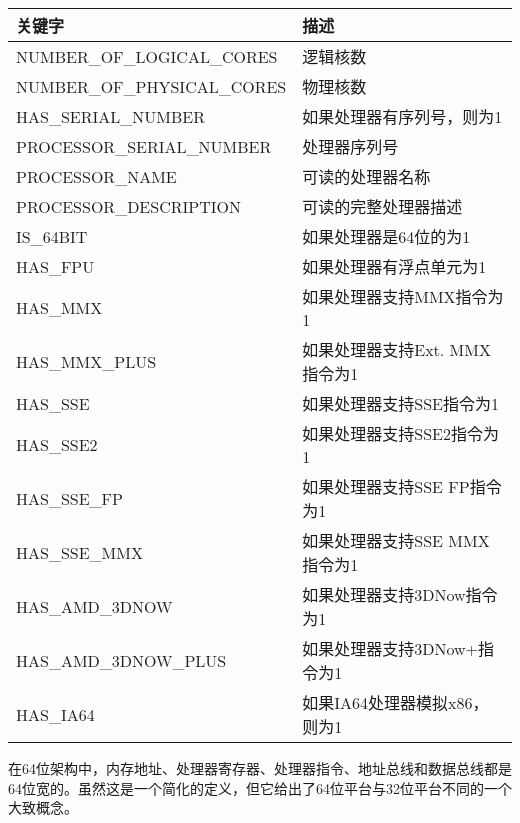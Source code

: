 \begin{longtable}{|l|l|}
\hline
\textbf{关键字}                & \textbf{描述}                                   \\ \hline
\endfirsthead
%
\endhead
%
NUMBER\_OF\_LOGICAL\_CORES  & 逻辑核数                       \\ \hline
NUMBER\_OF\_PHYSICAL\_CORES & 物理核数                      \\ \hline
HAS\_SERIAL\_NUMBER         & 如果处理器有序列号，则为1        \\ \hline
PROCESSOR\_SERIAL\_NUMBER   & 处理器序列号                       \\ \hline
PROCESSOR\_NAME             & 可读的处理器名称                 \\ \hline
PROCESSOR\_DESCRIPTION      & 可读的完整处理器描述     \\ \hline
IS\_64BIT                   & 如果处理器是64位的为1                      \\ \hline
HAS\_FPU                    & 如果处理器有浮点单元为1     \\ \hline
HAS\_MMX                    & 如果处理器支持MMX指令为1      \\ \hline
HAS\_MMX\_PLUS              & 如果处理器支持Ext. MMX指令为1 \\ \hline
HAS\_SSE                    & 如果处理器支持SSE指令为1      \\ \hline
HAS\_SSE2                   & 如果处理器支持SSE2指令为1     \\ \hline
HAS\_SSE\_FP                & 如果处理器支持SSE FP指令为1   \\ \hline
HAS\_SSE\_MMX               & 如果处理器支持SSE MMX指令为1  \\ \hline
HAS\_AMD\_3DNOW             & 如果处理器支持3DNow指令为1    \\ \hline
HAS\_AMD\_3DNOW\_PLUS       & 如果处理器支持3DNow+指令为1   \\ \hline
HAS\_IA64                   & 如果IA64处理器模拟x86，则为1          \\ \hline
\end{longtable}


在64位架构中，内存地址、处理器寄存器、处理器指令、地址总线和数据总线都是64位宽的。虽然这是一个简化的定义，但它给出了64位平台与32位平台不同的一个大致概念。

